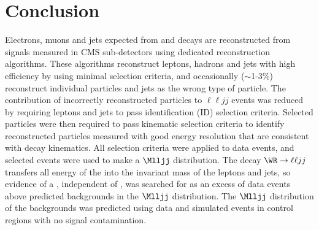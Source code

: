\section{Conclusion}
\label{sec:recoConclusion}
Electrons, muons and jets expected from \WR and \nul decays are reconstructed from signals measured in CMS sub-detectors using dedicated 
reconstruction algorithms.  These algorithms reconstruct leptons, hadrons and jets with high efficiency by using minimal selection criteria, 
and occasionally ($\sim$1-3\%) reconstruct individual particles and jets as the wrong type of particle.  The contribution of incorrectly 
reconstructed particles to $\ell\ell jj$ events was reduced by requiring leptons and jets to pass identification (ID) selection criteria.  
Selected particles were then required to pass kinematic selection criteria to identify reconstructed particles measured with good energy 
resolution that are consistent with \WR decay kinematics.  All selection criteria were applied to data events, and selected events were 
used to make a $\Mlljj$ distribution.  The decay $\WR \rightarrow \ell\ell jj$ transfers all energy of the \WR into the invariant mass of 
the leptons and jets, so evidence of a \WR, independent of \mnul, was searched for as an excess of data events above predicted backgrounds 
in the $\Mlljj$ distribution.  The $\Mlljj$ distribution of the backgrounds was predicted using data and simulated events in control regions 
with no signal contamination.



